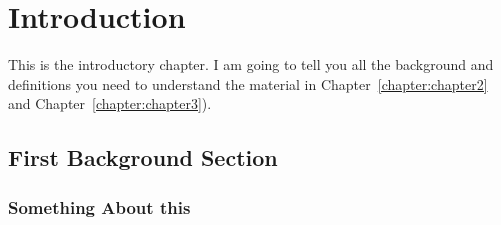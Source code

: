 \chapter{Introduction}

\label{chapter:introduction}

This is the introductory chapter. I am going to tell you all the background and definitions you need to understand the material in Chapter~\ref{chapter:chapter2} and Chapter~\ref{chapter:chapter3}).


\section{First Background Section }



\subsection{Something About this}

%
%
%
%
%
%
%
%
